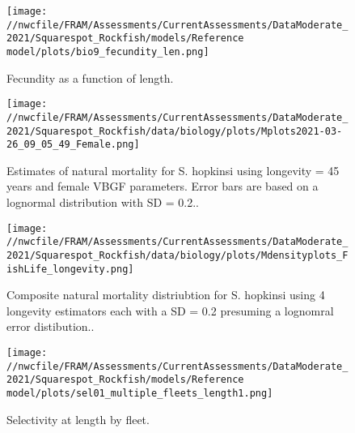 \documentclass[11pt,
  english,
  a4paper,
]{article}
\begin{document}
\tagmcend\tagstructend


\begin{figure}
\centering
\texttt{[image: //nwcfile/FRAM/Assessments/CurrentAssessments/DataModerate\_2021/Squarespot\_Rockfish/models/Reference model/plots/bio9\_fecundity\_len.png]}
\caption{Fecundity as a function of length.\label{fig:fecundity}}
\end{figure}

\tagmcend\tagstructend


\begin{figure}
\centering
\texttt{[image: //nwcfile/FRAM/Assessments/CurrentAssessments/DataModerate\_2021/Squarespot\_Rockfish/data/biology/plots/Mplots2021-03-26\_09\_05\_49\_Female.png]}
\caption{Estimates of natural mortality for S. hopkinsi using longevity = 45 years and female VBGF parameters. Error bars are based on a lognormal distribution with SD = 0.2..\label{fig:M_female}}
\end{figure}

\tagmcend\tagstructend


\begin{figure}
\centering
\texttt{[image: //nwcfile/FRAM/Assessments/CurrentAssessments/DataModerate\_2021/Squarespot\_Rockfish/data/biology/plots/Mdensityplots\_FishLife\_longevity.png]}
\caption{Composite natural mortality distriubtion for S. hopkinsi using 4 longevity estimators each with a SD = 0.2 presuming a lognomral error distibution..\label{fig:M_composite_dists}}
\end{figure}

\tagmcend\tagstructend


\begin{figure}
\centering
\texttt{[image: //nwcfile/FRAM/Assessments/CurrentAssessments/DataModerate\_2021/Squarespot\_Rockfish/models/Reference model/plots/sel01\_multiple\_fleets\_length1.png]}
\caption{Selectivity at length by fleet.\label{fig:selex}}
\end{figure}
\end{document}
